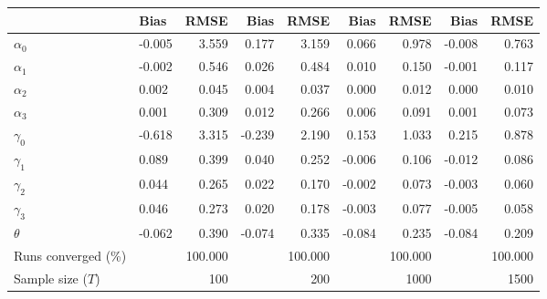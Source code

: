 
\begin{tabular}[t]{llrrrrrrr}
\toprule
  & Bias & RMSE & Bias & RMSE & Bias & RMSE & Bias & RMSE\\
\midrule
$\alpha_{0}$ & -0.005 & 3.559 & 0.177 & 3.159 & 0.066 & 0.978 & -0.008 & 0.763\\
$\alpha_{1}$ & -0.002 & 0.546 & 0.026 & 0.484 & 0.010 & 0.150 & -0.001 & 0.117\\
$\alpha_{2}$ & 0.002 & 0.045 & 0.004 & 0.037 & 0.000 & 0.012 & 0.000 & 0.010\\
$\alpha_{3}$ & 0.001 & 0.309 & 0.012 & 0.266 & 0.006 & 0.091 & 0.001 & 0.073\\
$\gamma_{0}$ & -0.618 & 3.315 & -0.239 & 2.190 & 0.153 & 1.033 & 0.215 & 0.878\\
$\gamma_{1}$ & 0.089 & 0.399 & 0.040 & 0.252 & -0.006 & 0.106 & -0.012 & 0.086\\
$\gamma_{2}$ & 0.044 & 0.265 & 0.022 & 0.170 & -0.002 & 0.073 & -0.003 & 0.060\\
$\gamma_{3}$ & 0.046 & 0.273 & 0.020 & 0.178 & -0.003 & 0.077 & -0.005 & 0.058\\
$\theta$ & -0.062 & 0.390 & -0.074 & 0.335 & -0.084 & 0.235 & -0.084 & 0.209\\
Runs converged (\%) &  & 100.000 &  & 100.000 &  & 100.000 &  & 100.000\\
Sample size ($T$) &  & 100 &  & 200 &  & 1000 &  & 1500\\
\bottomrule
\end{tabular}
